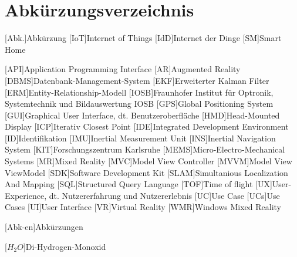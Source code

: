 
\chapter*{Abkürzungsverzeichnis}                   %

\begin{acronym}[DHBW]
 [Abk.]{Abkürzung}
 [IoT]{Internet of Things}
 [IdD]{Internet der Dinge}
 [SM]{Smart Home}



 [API]{Application Programming Interface}
 [AR]{Augmented Reality}
 [DBMS]{Datenbank-Management-System}
 [EKF]{Erweiterter Kalman Filter}
 [ERM]{Entity-Relationship-Modell}
 [IOSB]{Fraunhofer Institut für Optronik, Systemtechnik und Bildauswertung IOSB}
 [GPS]{Global Positioning System}
 [GUI]{Graphical User Interface, dt. Benutzeroberfläche}
 [HMD]{Head-Mounted Display}
 [ICP]{Iterativ Closest Point}
 [IDE]{Integrated Development Environment}
 [ID]{Identifikation}
 [IMU]{Inertial Measurement Unit}
 [INS]{Inertial Navigation System}
 [KIT]{Forschungszentrum Karlsruhe}
 [MEMS]{Micro-Electro-Mechanical Systems}
 [MR]{Mixed Reality}
 [MVC]{Model View Controller}
 [MVVM]{Model View ViewModel}
 [SDK]{Software Development Kit}
 [SLAM]{Simultanious Localization And Mapping}
 [SQL]{Structured Query Language}
 [TOF]{Time of flight}
 [UX]{User-Experience, dt. Nutzererfahrung und Nutzererlebnis}
 [UC]{Use Case}
 [UCs]{Use Cases}
 [UI]{User Interface}
 [VR]{Virtual Reality}
 [WMR]{Windows Mixed Reality}

 [Abk-en]{Abkürzungen}


 [\ensuremath{H_2O}]{Di-Hydrogen-Monoxid}

\end{acronym}
